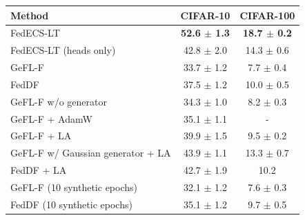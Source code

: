 \begin{tabular}{lcc}
\toprule
Method & CIFAR-10 & CIFAR-100\\
\midrule
FedECS-LT & \textbf{52.6 $\pm$ 1.3} & \textbf{18.7 $\pm$ 0.2}\\
FedECS-LT (heads only) & 42.8 $\pm$ 2.0 & 14.3 $\pm$ 0.6\\
GeFL-F & 33.7 $\pm$ 1.2 & 7.7 $\pm$ 0.4\\
FedDF & 37.5 $\pm$ 1.2 & 10.0 $\pm$ 0.5\\
GeFL-F w/o generator & 34.3 $\pm$ 1.0 & 8.2 $\pm$ 0.3\\
GeFL-F + AdamW & 35.1 $\pm$ 1.1 & -\\
GeFL-F + LA & 39.9 $\pm$ 1.5 & 9.5 $\pm$ 0.2\\
GeFL-F w/ Gaussian generator + LA & 43.9 $\pm$ 1.1 & 13.3 $\pm$ 0.7\\
FedDF + LA & 42.7 $\pm$ 1.9 & 10.2\\
GeFL-F (10 synthetic epochs) & 32.1 $\pm$ 1.2 & 7.6 $\pm$ 0.3\\
FedDF (10 synthetic epochs) & 35.1 $\pm$ 1.2 & 9.7 $\pm$ 0.5\\
\bottomrule
\end{tabular}
